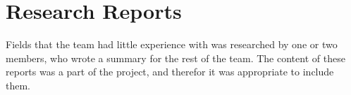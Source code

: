 \section{Research Reports}
Fields that the team had little experience with was researched by one or two members, who wrote a summary for the rest of the team. The content of these reports was a part of the project, and therefor it was appropriate to include them. 




